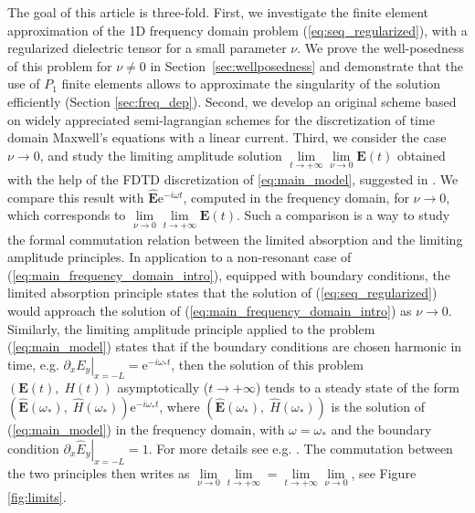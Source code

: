The goal of this article is three-fold. 
First, we investigate the finite element approximation of the 1D 
frequency domain problem (\ref{eq:seq_regularized}), with a regularized dielectric tensor for a small parameter $\nu$. We prove the well-posedness of this problem for $\nu\neq 0$ in Section~\ref{sec:wellposedness} and 
demonstrate that the use of  $P_1$ finite elements allows to approximate the singularity 
of the solution efficiently (Section \ref{sec:freq_dep}). Second, we develop an original scheme based on widely appreciated semi-lagrangian schemes
for the discretization of time domain Maxwell's equations with a linear current.
Third, we consider the case $\nu\rightarrow 0$, and study the limiting amplitude solution 
$\lim\limits_{t\rightarrow +\infty}\lim\limits_{\nu\rightarrow 0}\mathbf{E}(t)$ obtained with the help of 
the FDTD discretization of \eqref{eq:main_model}, suggested in \cite{stable_yee_plasma_current}. 
We compare this result with 
$\hat{\mathbf{E}}\mathrm{e}^{-i\omega t}$, computed in the frequency domain, for $\nu\rightarrow 0$, which corresponds to
$\lim\limits_{\nu\rightarrow 0}\lim\limits_{t\rightarrow+\infty}\mathbf{E}(t)$.
Such a comparison is a way to study the formal commutation relation between the limited absorption and the limiting amplitude principles. 
In application to a non-resonant case of (\ref{eq:main_frequency_domain_intro}), equipped with boundary conditions, the limited absorption principle states that the solution of (\ref{eq:seq_regularized}) 
would approach the solution of (\ref{eq:main_frequency_domain_intro})
as $\nu\rightarrow 0$. Similarly, the limiting amplitude principle applied to the problem (\ref{eq:main_model}) 
states that if the boundary conditions are chosen harmonic in time, e.g. $\left.\partial_x E_y\right|_{x=-L}=\mathrm{e}^{-i\omega_{*} t}$, then the solution of this problem $(\mathbf{E}(t),\;H(t))$ asymptotically ($t\rightarrow +\infty$)
tends to a steady state of the form $ \left(\hat{\mathbf{E}}(\omega_{*}),\; \hat{H}(\omega_{*})\right)\mathrm{e}^{-i\omega_{*} t}$, where 
$\left(\hat{\mathbf{E}}(\omega_{*}),\; \hat{H}(\omega_{*})\right)$ is the solution of (\ref{eq:main_model})
in the frequency domain, with $\omega=\omega_{*}$ and the boundary condition $\left.\partial_x \hat{E}_y\right|_{x=-L}=1$. For more details see e.g. \cite{Morawetz, Eidus}. The commutation between the two principles then writes as
$
\lim\limits_{\nu\rightarrow 0}\lim\limits_{t\rightarrow+\infty}= \lim\limits_{t\rightarrow+\infty}\lim\limits_{\nu\rightarrow 0}$,
see Figure \ref{fig:limits}. 
